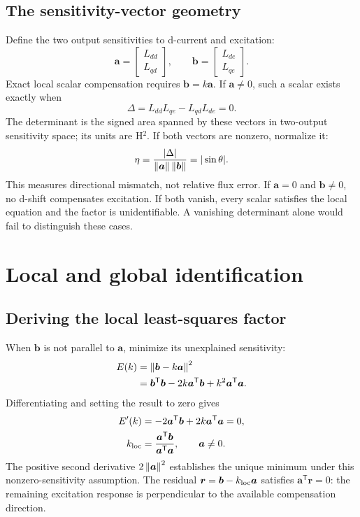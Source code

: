 \subsection{The sensitivity-vector geometry}
Define the two output sensitivities to d-current and excitation:
\begin{equation}\label{eq:sensitivity-vectors}
\bm a=\begin{bmatrix}L_{dd}\\L_{qd}\end{bmatrix},
\qquad
\bm b=\begin{bmatrix}L_{de}\\L_{qe}\end{bmatrix}.
\end{equation}
Exact local scalar compensation requires $\bm b=k\bm a$. If $\bm a\ne0$, such a scalar exists exactly when
\begin{equation}
\Delta=L_{dd}L_{qe}-L_{qd}L_{de}=0.
\end{equation}
The determinant is the signed area spanned by these vectors in two-output sensitivity space; its units are H$^2$. If both vectors are nonzero, normalize it:
\begin{equation}\label{eq:eta-angle}
\eta=\frac{|\Delta|}{\left\lVert\bm a\right\rVert\left\lVert\bm b\right\rVert}=|\sin\theta|.
\end{equation}
This measures directional mismatch, not relative flux error. If $\bm a=0$ and $\bm b\ne0$, no d-shift compensates excitation. If both vanish, every scalar satisfies the local equation and the factor is unidentifiable. A vanishing determinant alone would fail to distinguish these cases.

\section{Local and global identification}
\subsection{Deriving the local least-squares factor}
When $\bm b$ is not parallel to $\bm a$, minimize its unexplained sensitivity:
\begin{align}
E(k)&=\left\lVert\bm b-k\bm a\right\rVert^2\\
&=\bm b^{\mathsf T}\bm b-2k\bm a^{\mathsf T}\bm b
+k^2\bm a^{\mathsf T}\bm a.
\end{align}
Differentiating and setting the result to zero gives
\begin{align}
E'(k)&=-2\bm a^{\mathsf T}\bm b+2k\bm a^{\mathsf T}\bm a=0,\\
k_{\rm loc}&=\frac{\bm a^{\mathsf T}\bm b}{\bm a^{\mathsf T}\bm a},
\qquad \bm a\ne0.\label{eq:local-ls}
\end{align}
The positive second derivative $2\left\lVert\bm a\right\rVert^2$ establishes the unique minimum under this nonzero-sensitivity assumption. The residual $\bm r=\bm b-k_{\rm loc}\bm a$ satisfies $\bm a^{\mathsf T}\bm r=0$: the remaining excitation response is perpendicular to the available compensation direction.

